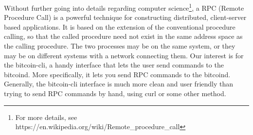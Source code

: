 \bigskip
\noindent
Without further going into details regarding computer science\footnote{For more details, see https://en.wikipedia.org/wiki/Remote\_procedure\_call}, a RPC (Remote Procedure Call) is a powerful technique for constructing distributed, client-server based applications. It is based on the extension of the conventional procedure calling, so that the called procedure need not exist in the same address space as the calling procedure. The two processes may be on the same system, or they may be on different systems with a network connecting them. Our interest is for the \colorbox{Grey!10}{bitcoin-cli}, a handy interface that lets the user send commands to the \colorbox{Grey!10}{bitcoind}. More specifically, it lets you send RPC commands to the \colorbox{Grey!10}{bitcoind}. Generally, the \colorbox{Grey!10}{bitcoin-cli} interface is much more clean and user friendly than trying to send RPC commands by hand, using \colorbox{Grey!10}{curl} or some other method.

